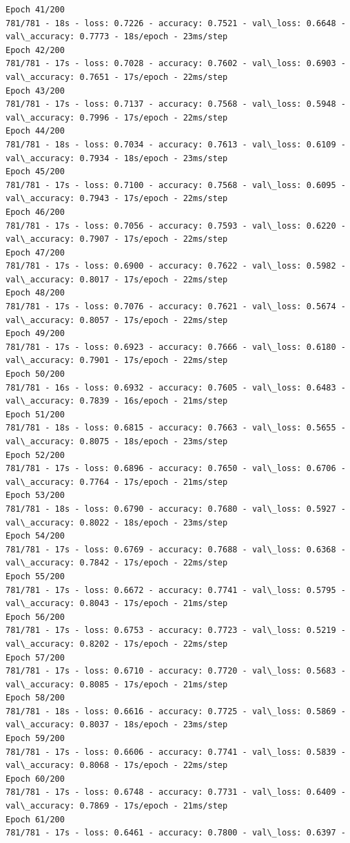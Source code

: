 \documentclass[11pt]{article}
\begin{document}
\begin{Verbatim}[commandchars=\\\{\}]
Epoch 41/200
781/781 - 18s - loss: 0.7226 - accuracy: 0.7521 - val\_loss: 0.6648 -
val\_accuracy: 0.7773 - 18s/epoch - 23ms/step
Epoch 42/200
781/781 - 17s - loss: 0.7028 - accuracy: 0.7602 - val\_loss: 0.6903 -
val\_accuracy: 0.7651 - 17s/epoch - 22ms/step
Epoch 43/200
781/781 - 17s - loss: 0.7137 - accuracy: 0.7568 - val\_loss: 0.5948 -
val\_accuracy: 0.7996 - 17s/epoch - 22ms/step
Epoch 44/200
781/781 - 18s - loss: 0.7034 - accuracy: 0.7613 - val\_loss: 0.6109 -
val\_accuracy: 0.7934 - 18s/epoch - 23ms/step
Epoch 45/200
781/781 - 17s - loss: 0.7100 - accuracy: 0.7568 - val\_loss: 0.6095 -
val\_accuracy: 0.7943 - 17s/epoch - 22ms/step
Epoch 46/200
781/781 - 17s - loss: 0.7056 - accuracy: 0.7593 - val\_loss: 0.6220 -
val\_accuracy: 0.7907 - 17s/epoch - 22ms/step
Epoch 47/200
781/781 - 17s - loss: 0.6900 - accuracy: 0.7622 - val\_loss: 0.5982 -
val\_accuracy: 0.8017 - 17s/epoch - 22ms/step
Epoch 48/200
781/781 - 17s - loss: 0.7076 - accuracy: 0.7621 - val\_loss: 0.5674 -
val\_accuracy: 0.8057 - 17s/epoch - 22ms/step
Epoch 49/200
781/781 - 17s - loss: 0.6923 - accuracy: 0.7666 - val\_loss: 0.6180 -
val\_accuracy: 0.7901 - 17s/epoch - 22ms/step
Epoch 50/200
781/781 - 16s - loss: 0.6932 - accuracy: 0.7605 - val\_loss: 0.6483 -
val\_accuracy: 0.7839 - 16s/epoch - 21ms/step
Epoch 51/200
781/781 - 18s - loss: 0.6815 - accuracy: 0.7663 - val\_loss: 0.5655 -
val\_accuracy: 0.8075 - 18s/epoch - 23ms/step
Epoch 52/200
781/781 - 17s - loss: 0.6896 - accuracy: 0.7650 - val\_loss: 0.6706 -
val\_accuracy: 0.7764 - 17s/epoch - 21ms/step
Epoch 53/200
781/781 - 18s - loss: 0.6790 - accuracy: 0.7680 - val\_loss: 0.5927 -
val\_accuracy: 0.8022 - 18s/epoch - 23ms/step
Epoch 54/200
781/781 - 17s - loss: 0.6769 - accuracy: 0.7688 - val\_loss: 0.6368 -
val\_accuracy: 0.7842 - 17s/epoch - 22ms/step
Epoch 55/200
781/781 - 17s - loss: 0.6672 - accuracy: 0.7741 - val\_loss: 0.5795 -
val\_accuracy: 0.8043 - 17s/epoch - 21ms/step
Epoch 56/200
781/781 - 17s - loss: 0.6753 - accuracy: 0.7723 - val\_loss: 0.5219 -
val\_accuracy: 0.8202 - 17s/epoch - 22ms/step
Epoch 57/200
781/781 - 17s - loss: 0.6710 - accuracy: 0.7720 - val\_loss: 0.5683 -
val\_accuracy: 0.8085 - 17s/epoch - 21ms/step
Epoch 58/200
781/781 - 18s - loss: 0.6616 - accuracy: 0.7725 - val\_loss: 0.5869 -
val\_accuracy: 0.8037 - 18s/epoch - 23ms/step
Epoch 59/200
781/781 - 17s - loss: 0.6606 - accuracy: 0.7741 - val\_loss: 0.5839 -
val\_accuracy: 0.8068 - 17s/epoch - 22ms/step
Epoch 60/200
781/781 - 17s - loss: 0.6748 - accuracy: 0.7731 - val\_loss: 0.6409 -
val\_accuracy: 0.7869 - 17s/epoch - 21ms/step
Epoch 61/200
781/781 - 17s - loss: 0.6461 - accuracy: 0.7800 - val\_loss: 0.6397 -

\end{Verbatim}
\end{document}
